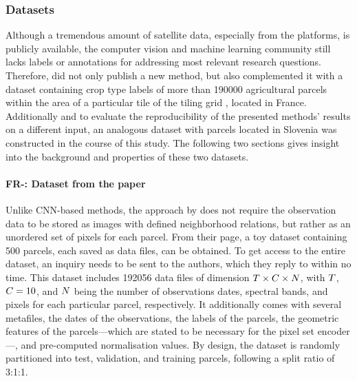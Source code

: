 \subsubsection{Datasets}

Although a tremendous amount of satellite data, especially from the \sentinel platforms, is publicly available, the computer vision and machine learning community still lacks labels or annotations for addressing most relevant research questions.
Therefore, \textcite{Garnot20:SIT} did not only publish a new method, but also complemented it with a dataset containing crop type labels of more than \num{190000} agricultural parcels within the area of a particular tile of the \sentinel tiling grid , located in France.
Additionally and to evaluate the reproducibility of the presented methods' results on a different input, an analogous dataset with parcels located in Slovenia was constructed in the course of this study.
The following two sections gives insight into the background and properties of these two datasets.

\paragraph{FR-: Dataset from the paper}
Unlike CNN-based methods, the approach by \citeauthor{Garnot20:SIT} does not require the observation data to be stored as images with defined neighborhood relations, but rather as an unordered set of pixels for each parcel.
From their \GitHub page, a toy dataset containing 500 parcels, each saved as \numpy data files, can be obtained.
To get access to the entire dataset, an inquiry needs to be sent to the authors, which they reply to within no time.
This dataset includes \num{192056} \numpy data files of dimension $ T \times C \times N$,
with $T$, $C=10$, and $N$ being the number of observations dates, spectral bands, and pixels for each particular parcel, respectively.
It additionally comes with several metafiles, \ie 
the dates of the observations, 
the labels of the parcels, 
the geometric features of the parcels---which are stated to be necessary for the pixel set encoder---, and 
pre-computed normalisation values.
By design, the dataset is randomly partitioned into test, validation, and training parcels, following a split ratio of 3:1:1.

